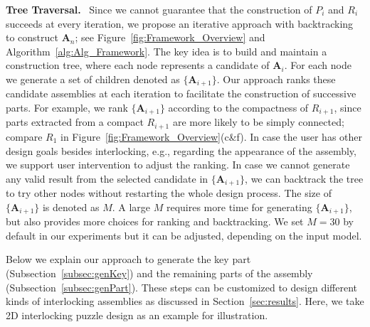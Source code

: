 \vspace*{1.0mm}
\noindent
{\bf Tree Traversal.}  \
Since we cannot guarantee that the construction of $P_i$ and $R_i$ succeeds at every iteration, we propose an iterative approach with backtracking to construct $\mathbf{A}_n$; see Figure~\ref{fig:Framework_Overview} and Algorithm~\ref{alg:Alg_Framework}.
The key idea is to build and maintain a construction tree, where each node represents a candidate of $\mathbf{A}_i$. For each node we generate a set of children denoted as $\{\mathbf{A}_{i+1}\}$. 
Our approach ranks these candidate assemblies at each iteration to facilitate the construction of successive parts.
For example, we rank $\{\mathbf{A}_{i+1}\}$ according to the compactness of $R_{i+1}$, since parts extracted from a compact $R_{i+1}$ are more likely to be simply connected; compare $R_1$ in Figure~\ref{fig:Framework_Overview}(c\&f). 
In case the user has other design goals besides interlocking, e.g., regarding the appearance of the assembly, we support user intervention to adjust the ranking.
%
In case we cannot generate any valid result from the selected candidate in $\{\mathbf{A}_{i+1}\}$, we can backtrack the tree to try other nodes without restarting the whole design process.
The size of $\{\mathbf{A}_{i+1}\}$ is denoted as $M$.
A large $M$ requires more time for generating $\{\mathbf{A}_{i+1}\}$, but also provides more choices for ranking and backtracking. We set $M = 30$ by default in our experiments but it can be adjusted, depending on the input model. 


Below we explain our approach to generate the key part (Subsection~\ref{subsec:genKey}) and the remaining parts of the assembly (Subsection~\ref{subsec:genPart}). These steps can be customized to design different kinds of interlocking assemblies as discussed in Section~\ref{sec:results}.
Here, we take 2D interlocking puzzle design as an example for illustration.



